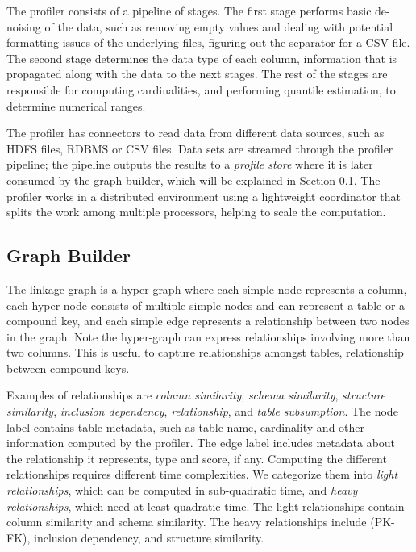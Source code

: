 The profiler consists of a pipeline of stages. The first stage
performs basic de-noising of the data, such as removing empty values and dealing
with potential formatting issues of the underlying files, \eg figuring out the
separator for a CSV file.  The second stage determines the data type of each
column, information that is propagated along with the data to the next stages.
The rest of the stages are responsible for computing cardinalities, and performing
quantile estimation, \eg to determine numerical ranges.

The profiler has connectors to read data from different data sources, such as
HDFS files, RDBMS or CSV files. Data sets are streamed through the profiler
pipeline;  the pipeline outputs the results
to a {\it profile store} where it is later consumed by the graph builder, which
will be explained in Section \ref{subsec:graphbuild}.
The profiler works in a distributed environment using a lightweight coordinator
that splits the work among multiple processors, helping to scale the
computation.



\subsection{Graph Builder}
\label{subsec:graphbuild}

The linkage graph is a hyper-graph where each simple node represents a column, each hyper-node consists of multiple simple nodes and can represent a table or a compound key, and each simple edge represents a relationship between two nodes in the graph. Note the hyper-graph can express relationships involving more than two columns. This is useful to capture relationships amongst tables, \eg \pkfk relationship between compound keys.

Examples of relationships are 
\emph{column similarity}, 
\emph{schema similarity}, 
\emph{structure similarity}, %
\emph{inclusion dependency}, 
\emph{\pkfk relationship}, and
\emph{table subsumption}. 
The node label contains table metadata, such as table name, cardinality and
other information computed by the profiler. The edge label includes metadata
about the relationship it represents, \eg type and score, if any. Computing the
different relationships requires different time complexities. We categorize them
into \textit{light relationships}, which can be computed in sub-quadratic time,
and \textit{heavy relationships}, which need at least quadratic time. The light
relationships contain column similarity and schema similarity. The heavy
relationships include \pkfk (PK-FK), inclusion dependency, and structure
similarity. 


